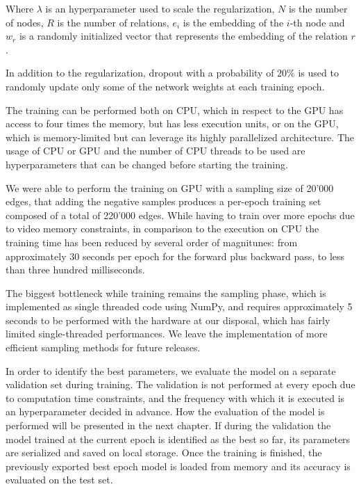 \documentclass[%
    corpo=13.5pt,
    twoside,
    oldstyle,
    tipotesi=magistrale,
    greek,
    evenboxes
]{toptesi}
\begin{document}
Where $\lambda$ is an hyperparameter used to scale the regularization, $N$ is
the number of nodes, $R$ is the number of relations, $e_i$ is the embedding of
the $i$-th node and $w_r$ is a randomly initialized vector that represents
the embedding of the relation $r$.

In addition to the regularization, dropout with a probability of $20\%$ is used
to randomly update only some of the network weights at each training epoch.

The training can be performed both on CPU, which in respect to the GPU has
access to four times the memory, but has less execution units, or on the GPU,
which is memory-limited but can leverage its highly parallelized architecture.
The usage of CPU or GPU and the number of CPU threads to be used are
hyperparameters that can be changed before starting the training.

We were able to perform the training on GPU with a sampling size of 20'000
edges, that adding the negative samples produces a per-epoch training set
composed of a total of 220'000 edges. While having to train over more epochs due
to video memory constraints, in comparison to the execution on CPU the training
time has been reduced by several order of magnitunes: from approximately 30
seconds per epoch for the forward plus backward pass, to less than three hundred
milliseconds.

The biggest bottleneck while training remains the sampling phase, which is
implemented as single threaded code using NumPy\cite{oliphant2006}, and
requires approximately 5 seconds to be performed with the hardware at our
disposal, which has fairly limited single-threaded performances. We
leave the implementation of more efficient sampling methods for future releases.

In order to identify the best parameters, we evaluate the model on a separate
validation set during training.
The validation is not performed at every epoch due to computation time
constraints, and the frequency with which it is executed is an hyperparameter
decided in advance.
How the evaluation of the model is performed will be presented in the next
chapter.
If during the validation the model trained at the current epoch is identified
as the best so far, its parameters are serialized and saved on local storage.
Once the training is finished, the previously exported best epoch model is
loaded from memory and its accuracy is evaluated on the test set.
\end{document}
